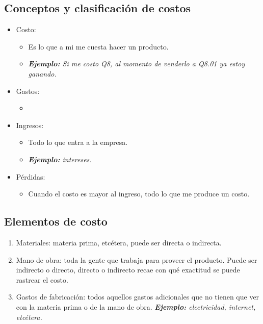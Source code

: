 \subsection{Conceptos y clasificación de costos}
\begin{itemize}
    \item Costo:
        \begin{itemize}
            \item Es lo que a mi me cuesta hacer un producto.
            \item \emph{\textbf{Ejemplo: }Si me costo Q8, al momento de venderlo a Q8.01 ya estoy ganando.}
        \end{itemize}
    
    \item Gastos:
        \begin{itemize}
            \item 
        \end{itemize}
    
    \item Ingresos:
        \begin{itemize}
            \item Todo lo que entra a la empresa.
            \item \emph{\textbf{Ejemplo: }intereses.}
        \end{itemize}
    
    \item Pérdidas:
        \begin{itemize}
            \item Cuando el costo es mayor al ingreso, todo lo que me produce un costo.
        \end{itemize}
\end{itemize}

\subsection{Elementos de costo}
\begin{enumerate}
    \item Materiales: materia prima, etcétera, puede ser directa o indirecta.
    \item Mano de obra: toda la gente que trabaja para proveer el producto. Puede ser indirecto o directo, directo o indirecto recae con qué exactitud se puede rastrear el costo.
    \item Gastos de fabricación: todos aquellos gastos adicionales que no tienen que ver con la materia prima o de la mano de obra. \emph{\textbf{Ejemplo: }electricidad, internet, etcétera.}
\end{enumerate}

